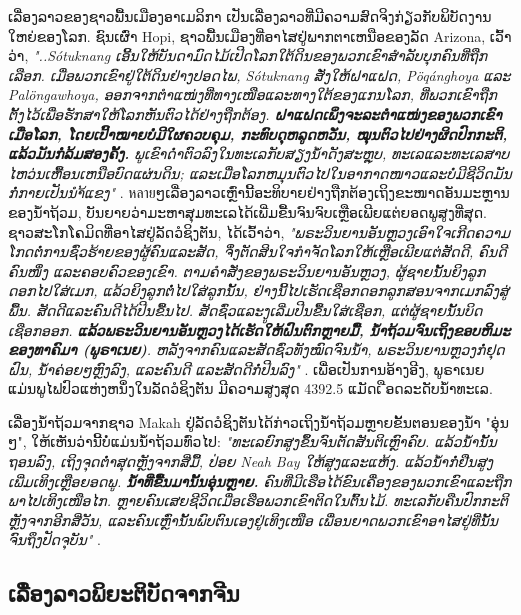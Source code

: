 \documentclass[10pt,twocolumn,letterpaper]{article}
\begin{document}
ເລື່ອງລາວຂອງຊາວພື້ນເມືອງອາເມລິກາ ເປັນເລື່ອງລາວທີ່ມີຄວາມສົດຈິງກ່ຽວກັບພິບັດງານໃຫຍ່ຂອງໂລກ. ຊົນເຜົ່າ Hopi, ຊາວພື້ນເມືອງທີ່ອາໄສຢູ່ພາກຕາເຫນືອຂອງລັດ Arizona, ເວົ້າວ່າ, \textit{"..Sótuknang ເອີ້ນໃຫ້ບັນດາມົດໄມ້ເປີດໂລກໃຕ້ດິນຂອງພວກເຂົາສໍາລັບບຸກຄົນທີ່ຖືກເລືອກ. ເມື່ອພວກເຂົາຢູ່ໃຕ້ດິນຢ່າງປອດໄພ, Sótuknang ສັ່ງໃຫ້ຝາແຝດ, Pöqánghoya ແລະ Palöngawhoya, ອອກຈາກຕຳແໜ່ງທີ່ທາງເໜືອແລະທາງໃຕ້ຂອງແກນໂລກ, ທີ່ພວກເຂົາຖືກຕັ້ງໄວ້ເພື່ອຮັກສາໃຫ້ໂລກຫັນຕົວໄດ້ຢ່າງຖືກຕ້ອງ. \textbf{ຝາແຝດເພິ່ງຈະລະຕຳແໜ່ງຂອງພວກເຂົາ ເມື່ອໂລກ, ໂດຍເປົ້າໝາຍບໍ່ມີໃຜຄວບຄຸມ, ກະທົບດຸຫລູດຫວັ່ນ, ໝຸນຕົວໄປຢ່າງຜິດປົກກະຕິ, ແລ້ວມັນກໍ່ລ້ມສອງຄັ້ງ.} ພູເຂົາດ່ຳຕົວລົງໃນທະເລກັບສຽງນ້ຳດັງສະຫຼຸບ, ທະເລແລະທະເລສາບໄຫວ່ນເຫື້ອນເຫນືອບົດແຜ່ນດິນ; ແລະເມື່ອໂລກຫມຸນຕົວໄປໃນອາກາດໜາວແລະບໍ່ມີຊີວິດມັນກໍ່ກາຍເປັນນຳ້ແຂງ"} \cite{4}.
หลายໆເລື່ອງລາວເຫຼົ່ານີ້ອະທິບາຍຢ່າງຖືກຕ້ອງເຖິງຂະໜາດອັນມະຫຼານຂອງນໍ້າຖ້ວມ, ບັນຍາຍວ່າມະຫາສຸມທະເລໄດ້ເພີ່ມຂື້ນຈົນຈົບເຫຼືອເພີຍແຕ່ຍອດພູສູງທີ່ສຸດ. ຊາວສະໂກໂຄມິດທີ່ອາໄສຢູ່ລັດວໍຊິງຕັນ, ໄດ້ເວົ້າວ່າ, \textit{"ພຣະວິນຍານອັນຫຼວງເອົາໃຈເກີດຄວາມໂກດຕໍ່ການຊົ່ວຮ້າຍຂອງຜູ້ຄົນແລະສັດ, ຈຶ່ງຕັດສິນໃຈກຳຈັດໂລກໃຫ້ເຫຼືອເພີຍແຕ່ສັດດີ, ຄົນດີຄົນໜຶ່ງ ແລະຄອບຄົວຂອງເຂົາ. ຕາມຄຳສັ່ງຂອງພຣະວິນຍານອັນຫຼວງ, ຜູ້ຊາຍນັ້ນຍິງລູກດອກໄປໃສ່ເມກ, ແລ້ວຍິງລູກຕໍ່່ໄປໃສ່ລູກນັ້ນ, ຢ່າງນີ້ໄປເຮັດເຊືອກດອກລູກສອນຈາກເມກລົງສູ່ພື້ນ. ສັດດີແລະຄົນດີໄດ້ປີນຂື້ນໄປ. ສັດຊົ່ວແລະງູເລີ່ມປີນຂື້ນໃສ່ເຊືອກ, ແຕ່ຜູ້ຊາຍນັ້ນບິດເຊືອກອອກ. \textbf{ແລ້ວພຣະວິນຍານອັນຫຼວງໄດ້ເຮັດໃຫ້ຝົນຕົກຫຼາຍມື້, ນໍ້າຖ້ວມຈົນເຖິງຂອບຫິມະຂອງທາຄົມາ (ພູຣາເນຍ)}. ຫລັງຈາກຄົນແລະສັດຊົ່ວທັງໝົດຈົນນໍ້າ, ພຣະວິນຍານຫຼວງກໍ່ຢຸດຝົນ, ນໍ້າຄ່ອຍໆຫຼົງລົງ, ແລະຄົນດີ ແລະສັດດີກໍ່ປີນລົງ"} \cite{3}. ເພື່ອເປັນການອ້າງອີງ, ພູຣາເນຍແມ່ນພູໄຟປົວແຫ່ງຫນຶ່ງໃນລັດວໍຊິງຕັນ ມີຄວາມສູງສຸດ 4392.5 ແມັດເ໫ືອດລະດັບນໍ້າທະເລ.

ເລື່ອງນໍ້າຖ້ວມຈາກຊາວ Makah ຢູ່ລັດວໍຊິງຕັນໄດ້ກ່າວເຖິງນໍ້າຖ້ວມຫຼາຍຂັ້ນຕອນຂອງນໍ້າ "ອຸ່ນໆ", ໃຫ້ເຫັນວ່ານີ້ບໍ່ແມ່ນນໍ້າຖ້ວມທົ່ວໄປ: \textit{"ທະເລຍົກສູງຂຶ້ນຈົນຕັດສັນຕິເຫຼົາຄົບ. ແລ້ວນໍ້ານັ້ນຖອນລົງ, ເຖິງຈຸດຕ່ຳສຸດຫຼັງຈາກສີ່ມື້, ປ່ອຍ Neah Bay ໃຫ້ສູງແລະແຫ້ງ. ແລ້ວນໍ້າກໍ່ຢືນສູງເພີ່ມເທິງເຫຼືອຍອດພູ. \textbf{ນໍ້າທີ່ຂື້ນມານັ້ນອຸ່ນຫຼາຍ.} ຄົນທີ່ມີເຮືອໄດ້ຂົນເຄື່ອງຂອງພວກເຂົາແລະຖືກພາໄປເທິງເໜືອໄກ. ຫຼາຍຄົນເສຍຊີວິດເມື່ອເຮືອພວກເຂົາຕິດໃນຕົ້ນໄມ້. ທະເລກັບຄືນປົກກະຕິຫຼັງຈາກອີກສີ່ວັນ, ແລະຄົນເຫຼົ່ານັ້ນພົບຕົນເອງຢູ່ເທິງເໜືອ ເພື່ອນຍາດພວກເຂົາອາໄສຢູ່ທີ່ນັ້ນຈົນຖຶງປັດຈຸບັນ"} \cite{3}.

\subsection{ເລື່ອງລາວພິຍະຕິບັດຈາກຈີນ}
\end{document}
